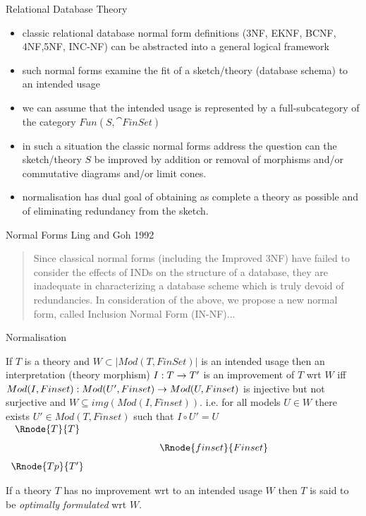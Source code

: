 \begin{frame}{Relational Database Theory}
\begin{itemize}
\item classic relational database normal form definitions ({\scriptsize 3NF, EKNF, BCNF, 4NF,5NF, INC-NF}) can be abstracted  into a general logical framework

\item such normal forms  examine the fit of a sketch/theory (database schema) to an intended usage

\item we can assume that the intended usage is represented by a full-subcategory of the category $Fun(S,\cat{FinSet})$

\item in such a situation the classic normal forms address the question can the sketch/theory $S$ be improved by addition or removal of morphisms and/or commutative diagrams and/or limit cones.
\item normalisation has dual goal of obtaining as complete a theory as possible and of eliminating redundancy from the sketch.  
\end{itemize}
\end{frame}

\begin{frame}{Normal Forms}
Ling and Goh 1992 
\begin{quote}
Since
classical normal forms (including the Improved 3NF)
have failed to consider the effects of INDs on the structure
of a database, they are inadequate in characterizing a
database scheme which is truly devoid of redundancies.
In consideration of the above, we propose a new normal
form, called Inclusion Normal Form (IN-NF)...
\end{quote}
\end{frame}

\iffalse %
\begin{frame}{Normalisation}
\begin{definition}
{ \footnotesize
If $T$ is a theory and $W \subset |Mod(T,FinSet)|$ is an intended usage then an interpretation (theory morphism) $I: T \rightarrow T'$ is an improvement of $T$ wrt $W$ iff 
$Mod(I,Finset): Mod(U',Finset) \rightarrow Mod(U,Finset)$ is injective but not surjective
and $W \subseteq img(Mod(I,Finset))$.
i.e. for all models $U \in W$ there exists $U' \in Mod(T,Finset)$ such that $I \circ U'=U$
$
\begin{array} {c p{2cm} c}
\Rnode{T}{T} && \\ [0.25cm]
             && \Rnode{finset}{Finset} \\ [0.25cm]
\Rnode{Tp}{T'}  
\end{array}
$
}
\end{definition}

\begin{definition}
If a theory $T$ has no improvement wrt to an intended usage $W$ then $T$ is said to be \textit{optimally formulated} wrt $W$.
\end{definition}
\end{frame}


